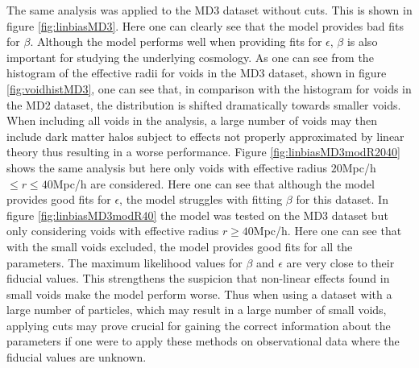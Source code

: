 The same analysis was applied to the MD3 dataset without cuts. This is shown in figure \ref{fig:linbiasMD3}. Here one can clearly see that the model provides bad fits for $\beta$. Although the model performs well when providing fits for $\epsilon$, $\beta$ is also important for studying the underlying cosmology. As one can see from the histogram of the effective radii for voids in the MD3 dataset, shown in figure \ref{fig:voidhistMD3}, one can see that, in comparison with the histogram for voids in the MD2 dataset, the distribution is shifted dramatically towards smaller voids. When including all voids in the analysis, a large number of voids may then include dark matter halos subject to effects not properly approximated by linear theory thus resulting in a worse performance. Figure \ref{fig:linbiasMD3modR2040} shows the same analysis but here only voids with effective radius $20$Mpc/h$\leq r\leq 40$Mpc/h are considered. Here one can see that although the model provides good fits for $\epsilon$, the model struggles with fitting $\beta$ for this dataset. In figure \ref{fig:linbiasMD3modR40} the model was tested on the MD3 dataset but only considering voids with effective radius $r\geq 40$Mpc/h. Here one can see that with the small voids excluded, the model provides good fits for all the parameters. The maximum likelihood values for $\beta$ and $\epsilon$ are very close to their fiducial values. This strengthens the suspicion that non-linear effects found in small voids make the model perform worse. Thus when using a dataset with a large number of particles, which may result in a large number of small voids, applying cuts may prove crucial for gaining the correct information about the parameters if one were to apply these methods on observational data where the fiducial values are unknown. \\\indent
